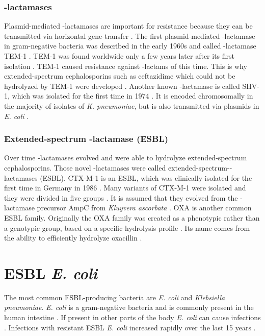 \subsubsection{\textbeta-lactamases}
\label{section:resistance_mechanisms}
Plasmid-mediated \textbeta-lactamases are important for resistance because they can be transmitted via horizontal gene-transfer \cite{munita_mechanisms_2016}.  
The first plasmid-mediated \textbeta-lactamase in gram-negative bacteria was described in the early 1960s and called \textbeta-lactamase TEM-1  \cite{fernandes_-lactams:_2013}. TEM-1 was found worldwide only a few years later after its first isolation \cite{fernandes_-lactams:_2013}. TEM-1 caused resistance against \textbeta-lactams of this time.  This is why extended-spectrum cephalosporins such as ceftazidime which could not be hydrolyzed by TEM-1 were developed \cite{fernandes_-lactams:_2013}. Another known \textbeta-lactamase is called SHV-1, which was isolated for the first time in 1974 \cite{kuzin_structure_1999}. It is encoded chromosomally in the majority of isolates of \textit{K. pneumoniae}, but is also transmitted via plasmids in \textit{E. coli} \cite{kuzin_structure_1999}. \\

\subsubsection{Extended-spectrum \textbeta-lactamase (ESBL)}
Over time \textbeta-lactamases evolved and were able to hydrolyze extended-spectrum \newline cephalosporins. Those novel \textbeta-lactamases were called extended-spectrum-\textbeta-lactamases (ESBL).  
CTX-M-1 is an ESBL, which was clinically isolated for the first time in Germany in 1986 \cite{bradford_extended-spectrum_2001}. Many variants of CTX-M-1 were isolated and they were divided in five groups \cite{fernandes_-lactams:_2013}.
It is assumed that they evolved from the \textbeta-lactamase precursor AmpC from \textit{Kluyvera ascorbata}  \cite{bradford_extended-spectrum_2001}. 
OXA is another common ESBL family. Originally the OXA family was created as a phenotypic rather than a genotypic group, based on a specific hydrolysis profile \cite{bradford_extended-spectrum_2001}. Its name comes from the ability to efficiently hydrolyze oxacillin \cite{bradford_extended-spectrum_2001}. \\

\section{ESBL \textit{E. coli}}
The most common ESBL-producing bacteria are \textit{E. coli} and \textit{Klebsiella pneumoniae}. \textit{E. coli} is a gram-negative bacteria and is commonly present in the human intestine \cite{swiss_hospitals_pathogens}. If present in other parts of the body \textit{E. coli} can cause infections \cite{swiss_hospitals_pathogens}. Infections with resistant ESBL \textit{E. coli} increased rapidly over the last 15 years \cite{swiss_hospitals}. 

